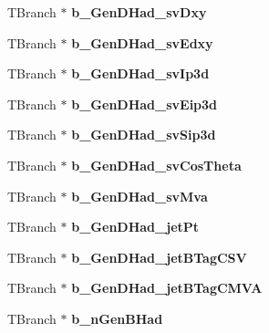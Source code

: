 \begin{DoxyCompactItemize}
\hypertarget{classMiniTree_a0fa4aaf9e2ad314fe67c6f40ba5a818e}{}\label{classMiniTree_a0fa4aaf9e2ad314fe67c6f40ba5a818e} 
T\+Branch $\ast$ {\bfseries b\+\_\+\+Gen\+D\+Had\+\_\+sv\+Dxy}
\item 
\hypertarget{classMiniTree_af2d9cb3186c6b22d6da6c80a7b64caf7}{}\label{classMiniTree_af2d9cb3186c6b22d6da6c80a7b64caf7} 
T\+Branch $\ast$ {\bfseries b\+\_\+\+Gen\+D\+Had\+\_\+sv\+Edxy}
\item 
\hypertarget{classMiniTree_a18b1825f3ff6c800280f360e0758e0b2}{}\label{classMiniTree_a18b1825f3ff6c800280f360e0758e0b2} 
T\+Branch $\ast$ {\bfseries b\+\_\+\+Gen\+D\+Had\+\_\+sv\+Ip3d}
\item 
\hypertarget{classMiniTree_a3bbbb276dbe257bbef9c38c68cbcae11}{}\label{classMiniTree_a3bbbb276dbe257bbef9c38c68cbcae11} 
T\+Branch $\ast$ {\bfseries b\+\_\+\+Gen\+D\+Had\+\_\+sv\+Eip3d}
\item 
\hypertarget{classMiniTree_aca4cd6d5e282d0d768af40a9a132273e}{}\label{classMiniTree_aca4cd6d5e282d0d768af40a9a132273e} 
T\+Branch $\ast$ {\bfseries b\+\_\+\+Gen\+D\+Had\+\_\+sv\+Sip3d}
\item 
\hypertarget{classMiniTree_a335724f5b822da93602714332d346c91}{}\label{classMiniTree_a335724f5b822da93602714332d346c91} 
T\+Branch $\ast$ {\bfseries b\+\_\+\+Gen\+D\+Had\+\_\+sv\+Cos\+Theta}
\item 
\hypertarget{classMiniTree_aa6a88ff160c37b10ea33dfd243e3836e}{}\label{classMiniTree_aa6a88ff160c37b10ea33dfd243e3836e} 
T\+Branch $\ast$ {\bfseries b\+\_\+\+Gen\+D\+Had\+\_\+sv\+Mva}
\item 
\hypertarget{classMiniTree_aa8e172f77ae0b06cff3e99defacbff6b}{}\label{classMiniTree_aa8e172f77ae0b06cff3e99defacbff6b} 
T\+Branch $\ast$ {\bfseries b\+\_\+\+Gen\+D\+Had\+\_\+jet\+Pt}
\item 
\hypertarget{classMiniTree_acac1268ae6b3f6a78d2e27a419bf3590}{}\label{classMiniTree_acac1268ae6b3f6a78d2e27a419bf3590} 
T\+Branch $\ast$ {\bfseries b\+\_\+\+Gen\+D\+Had\+\_\+jet\+B\+Tag\+C\+SV}
\item 
\hypertarget{classMiniTree_a675b148b3a00782a7bb86a447f4f22ea}{}\label{classMiniTree_a675b148b3a00782a7bb86a447f4f22ea} 
T\+Branch $\ast$ {\bfseries b\+\_\+\+Gen\+D\+Had\+\_\+jet\+B\+Tag\+C\+M\+VA}
\item 
\hypertarget{classMiniTree_a501e0ef99ef4a43801d2baca8f2f5638}{}\label{classMiniTree_a501e0ef99ef4a43801d2baca8f2f5638} 
T\+Branch $\ast$ {\bfseries b\+\_\+n\+Gen\+B\+Had}
\item 
\hypertarget{classMiniTree_a650132efd0e732e5f16a3e0657e8b624}{}\label{classMiniTree_a650132efd0e732e5f16a3e0657e8b624} 

\end{DoxyCompactItemize}
